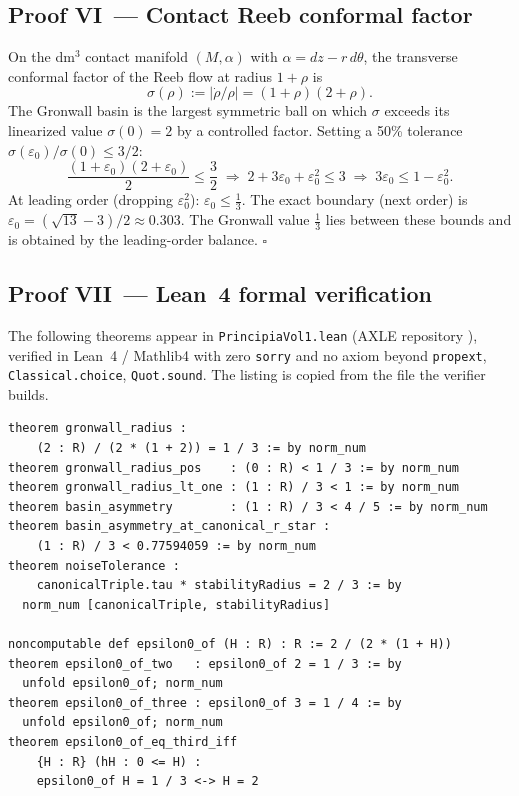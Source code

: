 \documentclass[14pt,a4paper]{extarticle}
\begin{document}
\subsection*{Proof VI\, — Contact Reeb conformal factor}

On the dm$^3$ contact manifold $(M,\alpha)$ with $\alpha = dz - r\,d\theta$,
the transverse conformal factor of the Reeb flow at radius $1+\rho$ is
\[
  \sigma(\rho) := |\dot\rho/\rho| = (1+\rho)(2+\rho).
\]
The Gronwall basin is the largest symmetric ball on which $\sigma$ exceeds its
linearized value $\sigma(0)=2$ by a controlled factor.
Setting a 50\% tolerance $\sigma(\varepsilon_0)/\sigma(0) \le 3/2$:
\[
  \frac{(1+\varepsilon_0)(2+\varepsilon_0)}{2} \le \frac{3}{2}
  \;\Longrightarrow\;
  2 + 3\varepsilon_0 + \varepsilon_0^2 \le 3
  \;\Longrightarrow\;
  3\varepsilon_0 \le 1 - \varepsilon_0^2.
\]
At leading order (dropping $\varepsilon_0^2$): $\varepsilon_0 \le \tfrac{1}{3}$.
The exact boundary (next order) is $\varepsilon_0 = (\sqrt{13}-3)/2 \approx 0.303$.
The Gronwall value $\tfrac{1}{3}$ lies between these bounds and is
obtained by the leading-order balance.
\hfill$\square$

\subsection*{Proof VII\, — Lean~4 formal verification}

The following theorems appear in \texttt{PrincipiaVol1.lean}
(AXLE repository \cite{AXLE2026}), verified in Lean~4 / Mathlib4
with zero \texttt{sorry} and no axiom beyond \texttt{propext},
\texttt{Classical.choice}, \texttt{Quot.sound}.
The listing is copied from the file the verifier builds.

\begin{verbatim}
theorem gronwall_radius :
    (2 : R) / (2 * (1 + 2)) = 1 / 3 := by norm_num
theorem gronwall_radius_pos    : (0 : R) < 1 / 3 := by norm_num
theorem gronwall_radius_lt_one : (1 : R) / 3 < 1 := by norm_num
theorem basin_asymmetry        : (1 : R) / 3 < 4 / 5 := by norm_num
theorem basin_asymmetry_at_canonical_r_star :
    (1 : R) / 3 < 0.77594059 := by norm_num
theorem noiseTolerance :
    canonicalTriple.tau * stabilityRadius = 2 / 3 := by
  norm_num [canonicalTriple, stabilityRadius]

noncomputable def epsilon0_of (H : R) : R := 2 / (2 * (1 + H))
theorem epsilon0_of_two   : epsilon0_of 2 = 1 / 3 := by
  unfold epsilon0_of; norm_num
theorem epsilon0_of_three : epsilon0_of 3 = 1 / 4 := by
  unfold epsilon0_of; norm_num
theorem epsilon0_of_eq_third_iff
    {H : R} (hH : 0 <= H) :
    epsilon0_of H = 1 / 3 <-> H = 2
\end{verbatim}
\end{document}
